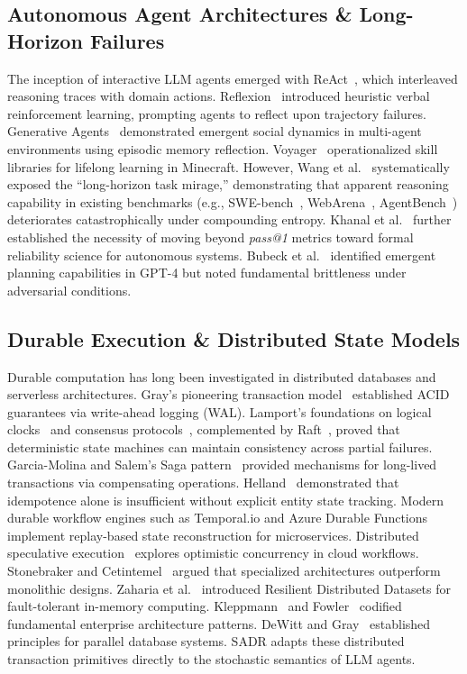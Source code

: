 \documentclass[10pt,journal,compsoc]{IEEEtran}
\begin{document}
\subsection{Autonomous Agent Architectures \& Long-Horizon Failures}
The inception of interactive LLM agents emerged with ReAct~\cite{yao2023react}, which interleaved reasoning traces with domain actions. Reflexion~\cite{shinn2023reflexion} introduced heuristic verbal reinforcement learning, prompting agents to reflect upon trajectory failures. Generative Agents~\cite{park2023generative} demonstrated emergent social dynamics in multi-agent environments using episodic memory reflection. Voyager~\cite{wang2023voyager} operationalized skill libraries for lifelong learning in Minecraft. However, Wang et al.~\cite{wang2026longhorizon} systematically exposed the ``long-horizon task mirage,'' demonstrating that apparent reasoning capability in existing benchmarks (e.g., SWE-bench~\cite{jimenez2024swebench}, WebArena~\cite{zhou2024webarena}, AgentBench~\cite{liu2024agentbench}) deteriorates catastrophically under compounding entropy. Khanal et al.~\cite{khanal2026reliability} further established the necessity of moving beyond \emph{pass@1} metrics toward formal reliability science for autonomous systems. Bubeck et al.~\cite{bubeck2023sparks} identified emergent planning capabilities in GPT-4 but noted fundamental brittleness under adversarial conditions.

\subsection{Durable Execution \& Distributed State Models}
Durable computation has long been investigated in distributed databases and serverless architectures. Gray's pioneering transaction model~\cite{gray1981transaction} established ACID guarantees via write-ahead logging (WAL). Lamport's foundations on logical clocks~\cite{lamport1978time} and consensus protocols~\cite{lamport1998paxos}, complemented by Raft~\cite{ongaro2014raft}, proved that deterministic state machines can maintain consistency across partial failures. Garcia-Molina and Salem's Saga pattern~\cite{garciamolina1987sagas} provided mechanisms for long-lived transactions via compensating operations. Helland~\cite{helland2020idempotence} demonstrated that idempotence alone is insufficient without explicit entity state tracking. Modern durable workflow engines such as Temporal.io and Azure Durable Functions~\cite{burckhardt2021durable} implement replay-based state reconstruction for microservices. Distributed speculative execution~\cite{li2024dse} explores optimistic concurrency in cloud workflows. Stonebraker and Cetintemel~\cite{stonebraker2005onesize} argued that specialized architectures outperform monolithic designs. Zaharia et al.~\cite{zaharia2012rdd} introduced Resilient Distributed Datasets for fault-tolerant in-memory computing. Kleppmann~\cite{kleppmann2017designing} and Fowler~\cite{fowler2005patterns} codified fundamental enterprise architecture patterns. DeWitt and Gray~\cite{dewitt1992parallel} established principles for parallel database systems. SADR adapts these distributed transaction primitives directly to the stochastic semantics of LLM agents.
\end{document}
